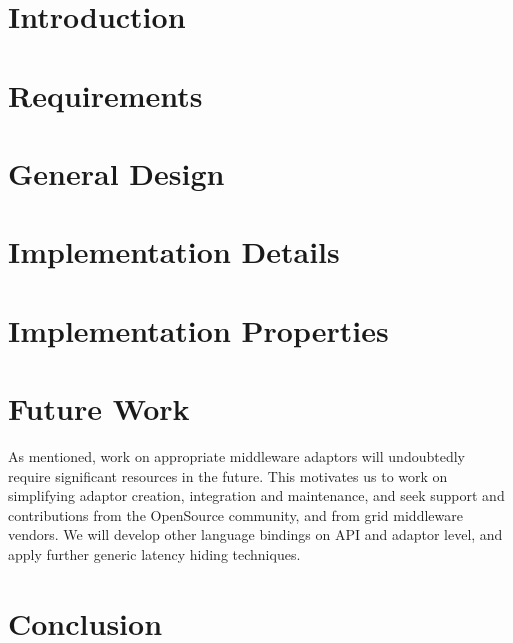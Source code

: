 \documentclass{acm_proc_article-sp}
\begin{document}

  \section{Introduction}
    \label{sec:intro}
    

  \section{Requirements}
    \label{sec:requirements}
    

  \section{General Design}
    \label{sec:generaldesign}
    

  \section{Implementation Details}
    \label{sec:details}
    

  \section{Implementation Properties}
    \label{sec:props}
    

	\section{Future Work}
		\label{sec:futurework}
		
	 As mentioned, work on appropriate middleware adaptors will
	 undoubtedly require significant resources in the future.
	 This motivates us to work on simplifying adaptor creation,
	 integration and maintenance, and seek support and contributions from the OpenSource
	 community, and from grid middleware vendors.  
	 We will develop other language bindings on API and adaptor level, and
	 apply further generic latency hiding techniques.

  \section{Conclusion}
    \label{sec:Conclusion}
    

\end{document}
